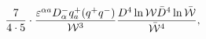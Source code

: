 \begin{equation}\label{extra_term}
{7 \over 4\cdot 5}\cdot {\varepsilon^{\alpha
a}D^{-}_{\alpha}q^{+}_{a} (q^{+}q^{-})\over {\cal W}^3} {D^4 \ln
{\cal W}\bar{D}^4 \ln \bar{\cal W}\over \bar{\cal W}^4},
\end{equation}

